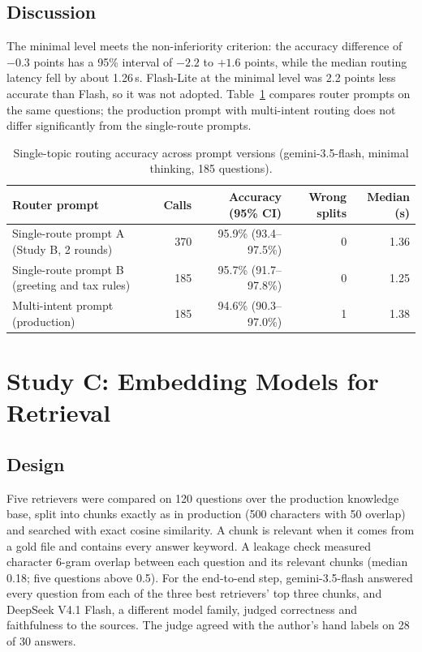 \documentclass[11pt,a4paper]{article}
\begin{document}
\subsection{Discussion}
The minimal level meets the non-inferiority criterion: the accuracy difference of $-0.3$ points has a 95\% interval of $-2.2$ to $+1.6$ points, while the median routing latency fell by about 1.26\,s. Flash-Lite at the minimal level was 2.2 points less accurate than Flash, so it was not adopted. Table~\ref{tab:b-prompts} compares router prompts on the same questions; the production prompt with multi-intent routing does not differ significantly from the single-route prompts.

\begin{table}[H]
\centering
\small
\caption{Single-topic routing accuracy across prompt versions (gemini-3.5-flash, minimal thinking, 185 questions).}\label{tab:b-prompts}
\begin{tabular}{lrrrr}
\toprule
\textbf{Router prompt} & \textbf{Calls} & \textbf{Accuracy (95\% CI)} & \textbf{Wrong splits} & \textbf{Median (s)} \\
\midrule
Single-route prompt A (Study B, 2 rounds) & 370 & 95.9\% (93.4--97.5\%) & 0 & 1.36 \\
Single-route prompt B (greeting and tax rules) & 185 & 95.7\% (91.7--97.8\%) & 0 & 1.25 \\
Multi-intent prompt (production) & 185 & 94.6\% (90.3--97.0\%) & 1 & 1.38 \\
\bottomrule
\end{tabular}
\end{table}


\section{Study C: Embedding Models for Retrieval}

\subsection{Design}
Five retrievers were compared on 120 questions over the production knowledge base, split into chunks exactly as in production (500 characters with 50 overlap) and searched with exact cosine similarity. A chunk is relevant when it comes from a gold file and contains every answer keyword. A leakage check measured character 6-gram overlap between each question and its relevant chunks (median 0.18; five questions above 0.5). For the end-to-end step, gemini-3.5-flash answered every question from each of the three best retrievers' top three chunks, and DeepSeek V4.1 Flash, a different model family, judged correctness and faithfulness to the sources. The judge agreed with the author's hand labels on 28 of 30 answers.
\end{document}
